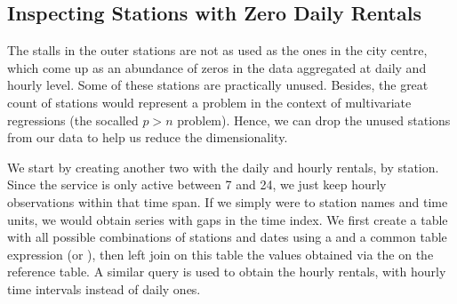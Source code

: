 \documentclass[letterpaper,10pt,english]{jupyterBook}
\begin{document}
\subsection{Inspecting Stations with Zero Daily Rentals}
\label{\detokenize{03-data_ingestion_and_spatial_operations:inspecting-stations-with-zero-daily-rentals}}
\sphinxAtStartPar
The stalls in the outer stations are not as used as the ones in the city centre, which come up as an abundance of zeros in the data aggregated at daily and hourly level. Some of these stations are practically unused. Besides, the great count of stations would represent a problem in the context of multivariate regressions (the so\sphinxhyphen{}called \(p > n\) problem). Hence, we can drop the unused stations from our data to help us reduce the dimensionality.

\sphinxAtStartPar
We start by creating another two  with the daily and hourly rentals, by station. Since the service is only active between 7 and 24, we just keep hourly observations within that time span. If we simply were to  station names and time units, we would obtain series with gaps in the time index. We first create a table with all possible combinations of stations and dates using a  and a common table expression (or ), then left join on this table the values obtained via the  on the reference table. A similar query is used to obtain the hourly rentals, with hourly time intervals instead of daily ones.
\end{document}
